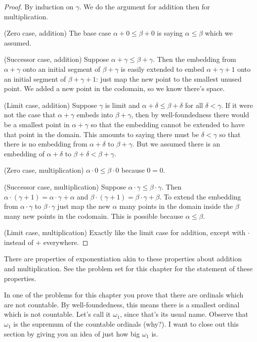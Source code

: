 \documentclass[10pt]{amsart}
\begin{document}
\begin{proof}
By induction on $\gamma$. We do the argument for addition then for multiplication.

(Zero case, addition) The base case $\alpha + 0 \le \beta + 0$ is saying $\alpha \le \beta$ which we assumed. 

(Successor case, addition) Suppose $\alpha + \gamma \le \beta + \gamma$.
 Then the embedding from $\alpha + \gamma $ onto an initial segment of $\beta + \gamma$ is easily extended to embed $\alpha + \gamma + 1$ onto an initial segment of $\beta + \gamma + 1$: just map the new point to the smallest unused point. We added a new point in the codomain, so we know there's space. 

(Limit case, addition) Suppose $\gamma$ is limit and $\alpha + \delta \le \beta + \delta$ for all $\delta < \gamma$. If it were not the case that $\alpha + \gamma$ embeds into $\beta + \gamma$, then by well-foundedness there would be a smallest point in $\alpha + \gamma$ so that the embedding cannot be extended to have that point in the domain. This amounts to saying there must be $\delta < \gamma$ so that there is no embedding from $\alpha + \delta$ to $\beta + \gamma$. But we assumed there is an embedding of $\alpha + \delta$ to $\beta + \delta < \beta + \gamma$.

(Zero case, multiplication) $\alpha \cdot 0 \le \beta \cdot 0$ because $0 = 0$.

(Successor case, multiplication) Suppose $\alpha \cdot \gamma \le \beta \cdot \gamma$. Then $\alpha \cdot (\gamma + 1) = \alpha \cdot \gamma + \alpha$ and $\beta \cdot (\gamma + 1) = \beta \cdot \gamma + \beta$. To extend the embedding from $\alpha \cdot \gamma$ to $\beta \cdot \gamma$ just map the new $\alpha$ many points in the domain inside the $\beta$ many new points in the codomain. This is possible because $\alpha \le \beta$.

(Limit case, multiplication) Exactly like the limit case for addition, except with $\cdot$ instead of $+$ everywhere.
\end{proof}

There are properties of exponentiation akin to these properties about addition and multiplication. See the problem set for this chapter for the statement of these properties.
\smallskip

In one of the problems for this chapter you prove that there are ordinals which are not countable. By well-foundedness, this means there is a smallest ordinal which is not countable. Let's call it $\omega_1$, since that's its usual name. Observe that $\omega_1$ is the supremum of the countable ordinals (why?). I want to close out this section by giving you an idea of just how big $\omega_1$ is. 
\end{document}
